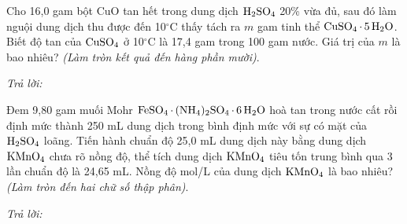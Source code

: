 \documentclass[11pt,a4paper]{article}
\def\loigiai#1{}
\begin{document}
\begin{ex}
Cho 16,0 gam bột CuO tan hết trong dung dịch $\ce{H2SO4}$ 20\% vừa đủ, sau đó làm nguội dung dịch thu được đến 10$^\circ$C thấy tách ra $m$ gam tinh thể $\ce{CuSO4.5H2O}$. Biết độ tan của $\ce{CuSO4}$ ở 10$^\circ$C là 17,4 gam trong 100 gam nước. Giá trị của $m$ là bao nhiêu? \textit{(Làm tròn kết quả đến hàng phần mười)}.
\loigiai{}
\end{ex}
\noindent\textit{Trả lời:} \dotfill
\vspace{0.2cm}

\begin{ex}
Đem 9,80 gam muối Mohr $\ce{FeSO4.(NH4)2SO4.6H2O}$ hoà tan trong nước cất rồi định mức thành 250 mL dung dịch trong bình định mức với sự có mặt của $\ce{H2SO4}$ loãng. Tiến hành chuẩn độ 25,0 mL dung dịch này bằng dung dịch $\ce{KMnO4}$ chưa rõ nồng độ, thể tích dung dịch $\ce{KMnO4}$ tiêu tốn trung bình qua 3 lần chuẩn độ là 24,65 mL. Nồng độ mol/L của dung dịch $\ce{KMnO4}$ là bao nhiêu? \textit{(Làm tròn đến hai chữ số thập phân)}.
\loigiai{}
\end{ex}
\noindent\textit{Trả lời:} \dotfill
\vspace{0.2cm}

\end{document}
